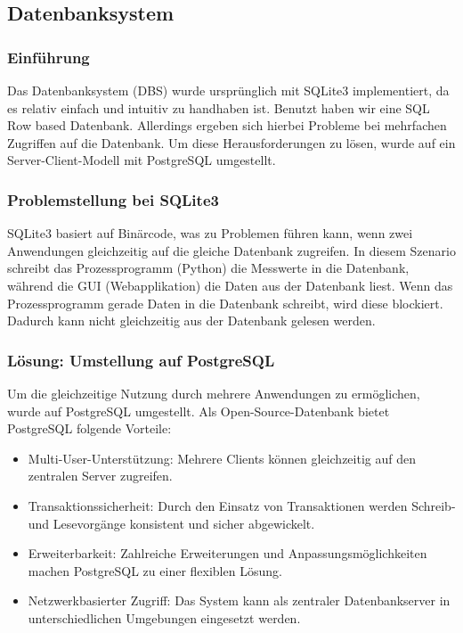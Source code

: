 \subsection{Datenbanksystem}\label{subsec:datenbanksystem}


\subsubsection{Einführung}

Das Datenbanksystem (DBS) wurde ursprünglich mit SQLite3 implementiert, da es relativ einfach und intuitiv zu handhaben ist. Benutzt haben wir eine SQL Row based Datenbank. Allerdings ergeben sich hierbei Probleme bei mehrfachen Zugriffen auf die Datenbank. Um diese Herausforderungen zu lösen, wurde auf ein Server-Client-Modell mit PostgreSQL umgestellt.


\subsubsection{Problemstellung bei SQLite3}

SQLite3 basiert auf Binärcode, was zu Problemen führen kann, wenn zwei Anwendungen gleichzeitig auf die gleiche Datenbank zugreifen. In diesem Szenario schreibt das Prozessprogramm (Python) die Messwerte in die Datenbank, während die GUI (Webapplikation) die Daten aus der Datenbank liest. Wenn das Prozessprogramm gerade Daten in die Datenbank schreibt, wird diese blockiert. Dadurch kann nicht gleichzeitig aus der Datenbank gelesen werden.


\subsubsection{Lösung: Umstellung auf PostgreSQL}

Um die gleichzeitige Nutzung durch mehrere Anwendungen zu ermöglichen, wurde auf PostgreSQL umgestellt. Als Open-Source-Datenbank bietet PostgreSQL folgende Vorteile:

\begin{itemize}
    \item Multi-User-Unterstützung: Mehrere Clients können gleichzeitig auf den zentralen Server zugreifen.
    \item Transaktionssicherheit: Durch den Einsatz von Transaktionen werden Schreib- und Lesevorgänge konsistent und sicher abgewickelt.
    \item Erweiterbarkeit: Zahlreiche Erweiterungen und Anpassungsmöglichkeiten machen PostgreSQL zu einer flexiblen Lösung.
    \item Netzwerkbasierter Zugriff: Das System kann als zentraler Datenbankserver in unterschiedlichen Umgebungen eingesetzt werden.
\end{itemize}

